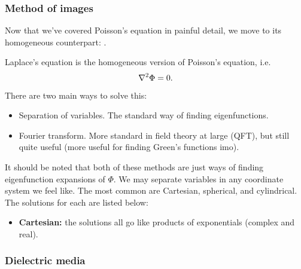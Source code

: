 \documentclass[11pt]{article}
\begin{document}
\begin{eexample}
\end{eexample}

\subsubsection{Method of images}

Now that we've covered Poisson's equation in painful
detail, we move to its homogeneous counterpart: .

\begin{iidea}
    Laplace's equation is the homogeneous version of Poisson's
    equation, i.e.
    \begin{align*}
        \nabla^2 \Phi = 0.
    \end{align*}
    There are two main ways to solve this:
    \begin{itemize}
        \item Separation of variables. The standard way of finding eigenfunctions.
        \item Fourier transform. More standard in field
        theory at large (QFT), but still quite useful
        (more useful for finding Green's functions imo).
    \end{itemize}
    It should be noted that both of these methods are just ways of
    finding eigenfunction expansions of $\Phi$. We may separate variables in 
    any coordinate system we feel like. The most common are Cartesian, spherical, 
    and cylindrical. The solutions for each are listed below:
    \begin{itemize}
        \item \textbf{Cartesian:} the solutions all go like products
        of exponentials (complex and real). 
    \end{itemize}
\end{iidea}

\begin{iidea}
\end{iidea}

\subsubsection{Dielectric media}
\end{document}
